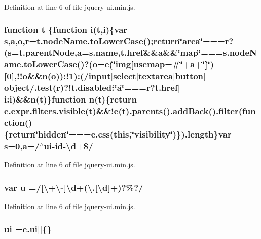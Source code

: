 {{Definition at line 6 of file jquery-\/ui.\+min.\+js.

\subsubsection[{\texorpdfstring{t}{t}}]{\setlength{\rightskip}{0pt plus 5cm}function t \{function {\bf i}(t,{\bf i})\{var {\bf s},{\bf a},{\bf o},{\bf r}=t.\+node\+Name.\+to\+Lower\+Case();return\char`\"{}area\char`\"{}===r?({\bf s}=t.\+parent\+Node,{\bf a}={\bf s.\+name},t.\+href\&\&{\bf a}\&\&\char`\"{}map\char`\"{}===s.\+node\+Name.\+to\+Lower\+Case()?({\bf o}={\bf e}(\char`\"{}img\mbox{[}usemap=\#\char`\"{}+a+\char`\"{}\mbox{]}\char`\"{})\mbox{[}0\mbox{]},!!{\bf o}\&\&{\bf n}({\bf o}))\+:!1)\+:(/{\bf input}$\vert$select$\vert$textarea$\vert${\bf button}$\vert$object/.test({\bf r})?!t.\+disabled\+:\char`\"{}a\char`\"{}===r?t.\+href$\vert$$\vert$i\+:i)\&\&{\bf n}(t)\}function {\bf n}(t)\{return e.\+expr.\+filters.\+visible(t)\&\&!{\bf e}(t).parents().add\+Back().filter(function()\{return\char`\"{}hidden\char`\"{}===e.\+css({\bf this},\char`\"{}visibility\char`\"{})\}).length\}var {\bf s}=0,{\bf a}=/$^\wedge${\bf ui}-\/id-\/\textbackslash{}{\bf d}+\$/}\hypertarget{jquery-ui_8min_8js_a23c5666e83bbbceee94adcd0851f50c4}{}\label{jquery-ui_8min_8js_a23c5666e83bbbceee94adcd0851f50c4}


Definition at line 6 of file jquery-\/ui.\+min.\+js.

\subsubsection[{\texorpdfstring{u}{u}}]{\setlength{\rightskip}{0pt plus 5cm}var u =/\mbox{[}\textbackslash{}+\textbackslash{}-\/\mbox{]}\textbackslash{}{\bf d}+(\textbackslash{}.\mbox{[}\textbackslash{}{\bf d}\mbox{]}+)?\%?/}\hypertarget{jquery-ui_8min_8js_accb4ce8dd4113ac0f510653e31809106}{}\label{jquery-ui_8min_8js_accb4ce8dd4113ac0f510653e31809106}


Definition at line 6 of file jquery-\/ui.\+min.\+js.

\subsubsection[{\texorpdfstring{ui}{ui}}]{ ui =e.\+ui$\vert$$\vert$\{\}}\hypertarget{jquery-ui_8min_8js_a8ebc3a47bff7b1c2623695f3db4c0761}{}\label{jquery-ui_8min_8js_a8ebc3a47bff7b1c2623695f3db4c0761}


}}
